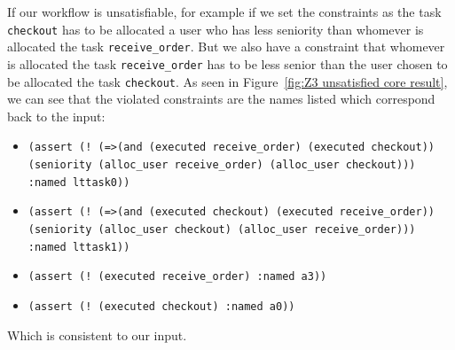 \documentclass[a4paper]{report}
\begin{document}
If our workflow is unsatisfiable, for example if we set the constraints as the task \texttt{checkout} has to be allocated a user who has less seniority than whomever is allocated the task \texttt{receive\_order}. But we also have a constraint that whomever is allocated the task \texttt{receive\_order} has to be less senior than the user chosen to be allocated the task \texttt{checkout}. As seen in Figure~\ref{fig:Z3 unsatisfied core result}, we can see that the violated constraints are the names listed which correspond back to the input:
\begin{itemize}
\item  \texttt{(assert (! (=>(and (executed receive\_order) (executed checkout))\\
(seniority (alloc\_user receive\_order) (alloc\_user checkout)))\\
:named lttask0))}
\item \texttt{(assert (! (=>(and (executed checkout) (executed receive\_order))\\
(seniority (alloc\_user checkout) (alloc\_user receive\_order))) \\
:named lttask1))}
\item \texttt{(assert (! (executed receive\_order) :named a3))}
\item \texttt{(assert (! (executed checkout) :named a0))}
\end{itemize}
Which is consistent to our input.
\end{document}

